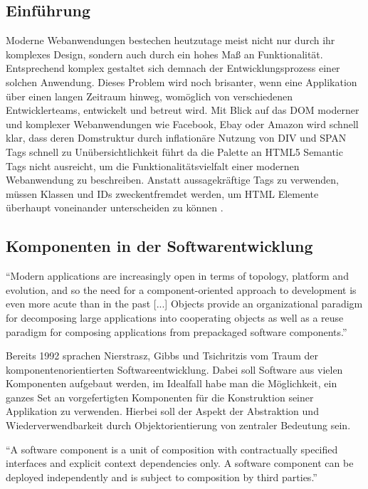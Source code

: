 \subsection{Einführung}

Moderne Webanwendungen bestechen heutzutage meist nicht nur durch ihr komplexes Design,
sondern auch durch ein hohes Maß an Funktionalität.
Entsprechend komplex gestaltet sich demnach der Entwicklungsprozess einer solchen Anwendung.
Dieses Problem wird noch brisanter, wenn eine Applikation über einen langen Zeitraum hinweg,
womöglich von verschiedenen Entwicklerteams, entwickelt und betreut wird. Mit Blick auf das \ac{DOM} moderner und komplexer Webanwendungen wie Facebook, Ebay oder Amazon
wird schnell klar, dass deren Domstruktur durch inflationäre Nutzung von DIV und SPAN Tags schnell zu Unübersichtlichkeit führt
da die Palette an HTML5 Semantic Tags nicht ausreicht, um die Funktionalitätsvielfalt einer modernen Webanwendung zu beschreiben.
Anstatt aussagekräftige Tags zu verwenden, müssen Klassen und IDs zweckentfremdet werden, um HTML Elemente überhaupt voneinander unterscheiden zu können
\cite{sitepoint-introduction-to-webcomponents}.

\subsection{Komponenten in der Softwarentwicklung}

``Modern applications are increasingly
open in terms of topology,
platform and evolution, and so the
need for a component-oriented
approach to development is even
more acute than in the past [...]  Objects provide an organizational
paradigm for decomposing large
applications into cooperating objects
as well as a reuse paradigm for
composing applications from prepackaged
software components.''
\cite{nierstrasz1992component}

\vspace{0.5cm}

Bereits 1992 sprachen Nierstrasz, Gibbs und Tsichritzis vom Traum der komponentenorientierten Softwareentwicklung.
Dabei soll Software aus vielen Komponenten aufgebaut werden, im Idealfall habe man die Möglichkeit, ein
ganzes Set an vorgefertigten Komponenten für die Konstruktion seiner Applikation zu verwenden.
Hierbei soll der Aspekt der Abstraktion und Wiederverwendbarkeit durch Objektorientierung von zentraler Bedeutung sein.

\vspace{0.5cm}
``A software component is a unit of composition with contractually specified interfaces and explicit
context dependencies only. A software component can be deployed independently and is subject to composition
by third parties.''
\cite{Szyperski}
\vspace{0.5cm}

